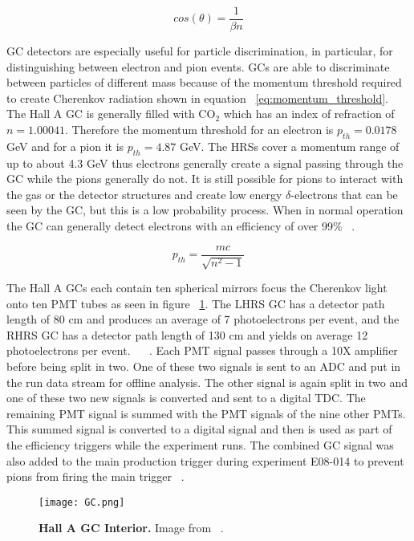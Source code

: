 \begin{equation} \label{eq:shock_wave_angle}
	cos(\theta) = \frac{1}{\beta n}
\end{equation}

GC detectors are especially useful for particle discrimination, in particular, for distinguishing between electron and pion events. GCs are able to discriminate between particles of different mass because of the momentum threshold required to create Cherenkov radiation shown in equation ~\ref{eq:momentum_threshold}. The Hall A GC is generally filled with CO$_2$ which has an index of refraction of $n=1.00041$. Therefore the momentum threshold for an electron is $p_{th}=0.0178$ GeV and for a pion it is $p_{th}=4.87$ GeV. The HRSs cover a momentum range of up to about 4.3 GeV thus electrons generally create a signal passing through the GC while the pions generally do not. It is still possible for pions to interact with the gas or the detector structures and create low energy $\delta$-electrons that can be seen by the GC, but this is a low probability process. When in normal operation the GC can generally detect electrons with an efficiency of over 99$\%$ ~\cite{Thesis:Ye}.

\begin{equation} \label{eq:momentum_threshold}
	p_{th} = \frac{mc}{\sqrt{n^2-1}}
\end{equation}

The Hall A GCs each contain ten spherical mirrors focus the Cherenkov light onto ten PMT tubes as seen in figure ~\ref{fig:gc}. The LHRS GC has a detector path length of 80 cm and produces an average of 7 photoelectrons per event, and the RHRS GC has a detector path length of 130 cm and yields on average 12 photoelectrons per event. ~\cite{Article:HallA} ~\cite{Article:GC}. Each PMT signal passes through a 10X amplifier before being split in two. One of these two signals is sent to an ADC and put in the run data stream for offline analysis. The other signal is again split in two and one of these two new signals is converted and sent to a digital TDC. The remaining PMT signal is summed with the PMT signals of the nine other PMTs. This summed signal is converted to a digital signal and then is used as part of the efficiency triggers while the experiment runs. The combined GC signal was also added to the main production trigger during experiment E08-014 to prevent pions from firing the main trigger ~\cite{Thesis:Ye}.

\begin{figure}[!ht]
\begin{center}
\texttt{[image: GC.png]}
\end{center}
\caption{
{\bf{Hall A GC Interior.}} Image from ~\cite{Thesis:Ye}.}
\label{fig:gc}
\end{figure}

